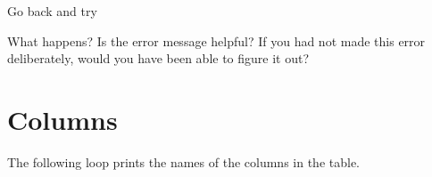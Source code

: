 \documentclass[letterpaper,10pt,english]{sphinxmanual}
\begin{document}
 Go back and try

\begin{sphinxVerbatim}[commandchars=\\\{\}]
  
\end{sphinxVerbatim}

What happens?  Is the error message helpful?  If you had not made this error deliberately, would you have been able to figure it out?


\section{Columns}
\label{\detokenize{01_query:columns}}
The following loop prints the names of the columns in the table.

\begin{sphinxVerbatim}[commandchars=\\\{\}]
   
\end{sphinxVerbatim}
\end{document}
